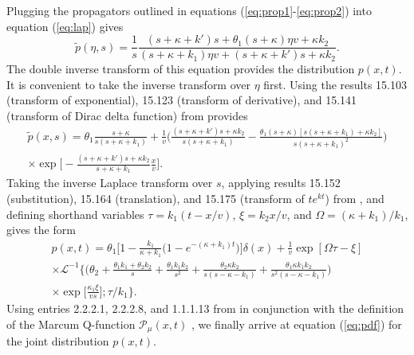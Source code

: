 \documentclass[]{agujournal2018}
\newcommand\be{\begin{equation}}
\newcommand\ee{\end{equation}}
\newcommand\tp{\tilde{p}}
\newcommand\El{\mathcal{L}}
\begin{document}
Plugging the propagators outlined in equations (\ref{eq:prop1}-\ref{eq:prop2}) into equation (\ref{eq:lap}) gives 
\be \tilde{p}(\eta,s) = \frac{1}{s}\frac{(s+\kappa + k')s  + \theta_1(s+\kappa )\eta v+ \kappa k_2}{(s+\kappa+k_1)\eta v+(s+\kappa+k')s + \kappa k_2}.\label{eq:nicedist}\ee
The double inverse transform of this equation provides the distribution $p(x,t)$.
It is convenient to take the inverse transform over $\eta$ first.
Using the results 15.103 (transform of exponential), 15.123 (transform of derivative), and 15.141 (transform of Dirac delta function) from \citet{Arfken1985} provides 
\begin{multline} \tp(x,s) = \theta_1 \frac{s+\kappa}{s(s+\kappa + k_1)} + \frac{1}{v} \Big(\frac{(s+\kappa+k')s+\kappa k_2}{s(s+\kappa+k_1)} - \frac{\theta_1(s+\kappa)[s(s+\kappa+k_1)+\kappa k_2]}{s(s+\kappa+k_1)^2}\Big)\\
\times \exp\Big[-\frac{(s+\kappa+k')s+\kappa k_2}{s+\kappa+k_1}\frac{x}{v}\Big].\end{multline}
Taking the inverse Laplace transform over $s$, applying results 15.152 (substitution), 15.164 (translation), and 15.175 (transform of $te^{kt}$) from \citet{Arfken1985}, and defining shorthand variables $\tau = k_1(t-x/v)$, $\xi = k_2 x/v$, and $\Omega = (\kappa + k_1)/k_1$, gives the form 
\begin{multline}
p(x,t) = \theta_1\Big[1-\frac{k_1}{\kappa + k_1}\big(1-e^{-(\kappa + k_1)t}\big)\Big]\delta(x) + \frac{1}{v}\exp[\Omega \tau - \xi]\\
\times \El^{-1}\Big\{\Big( \theta_2 + \frac{\theta_1k_1+\theta_2 k_2}{s}+\frac{\theta_1k_1k_2}{s^2} + \frac{\theta_2\kappa k_2}{s(s-\kappa-k_1)} + \frac{\theta_1\kappa k_1 k_2}{s^2(s-\kappa-k_1)}\Big)\\
\times\exp\big[\frac{\kappa_1 \xi}{vs}\big];\tau/k_1\Big\}.
\end{multline}
Using entries 2.2.2.1, 2.2.2.8, and 1.1.1.13 from \citet{Prudnikov1992a} in conjunction with the definition of the Marcum Q-function $ \mathcal{P}_\mu(x,t)$ \citep[e.g.][]{Temme1996}, we finally arrive at equation (\ref{eq:pdf}) for the joint distribution $p(x,t)$.
\end{document}
